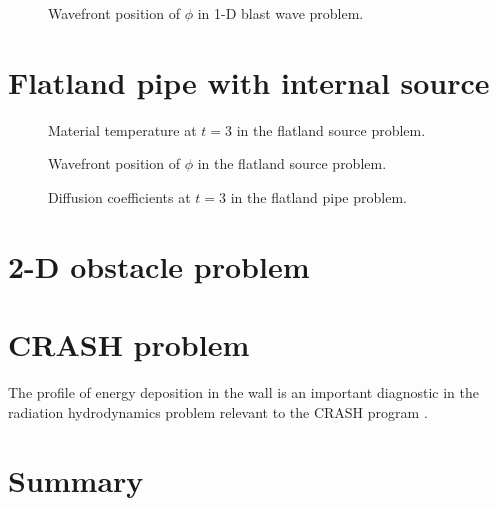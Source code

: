 \begin{figure}[htb]
  \centering\small
  
  \caption{Wavefront position of $\phi$ in 1-D blast wave problem.}
  \label{fig:1dblastWavefront}
\end{figure}

\section{Flatland pipe with internal source}

\begin{figure}[htb]
  \centering\small
  \hspace{-.5in}
  \caption{Material temperature at $t=3$ in the flatland source problem.}
  \label{fig:crashaltMattemp}
\end{figure}

\begin{figure}[htb]
  \centering\small
  
  \caption{Wavefront position of $\phi$ in the flatland source problem.}
  \label{fig:crashaltWavefront}
\end{figure}


\begin{figure}[htb]
  \centering\small
  \hspace{-.5in}
  \caption{Diffusion coefficients at $t=3$ in the flatland pipe problem.}
  \label{fig:crashaltDcoeff}
\end{figure}


\section{2-D obstacle problem}
\cite{Mou2006}

\section{CRASH problem}
The profile of energy deposition in the wall is an important diagnostic in the
radiation hydrodynamics problem relevant to the CRASH program \cite{HolCom2011}.

\section{Summary}

